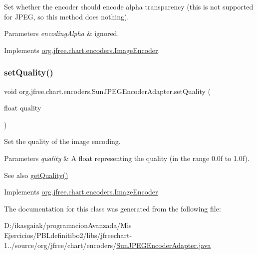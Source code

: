 Set whether the encoder should encode alpha transparency (this is not supported for J\+P\+EG, so this method does nothing).


\begin{DoxyParams}{Parameters}
{\em encoding\+Alpha} & ignored. \\
\hline
\end{DoxyParams}


Implements \mbox{\hyperlink{interfaceorg_1_1jfree_1_1chart_1_1encoders_1_1_image_encoder_a1f75e96b9ec512882b6d32c4f0bac3d2}{org.\+jfree.\+chart.\+encoders.\+Image\+Encoder}}.

\mbox{\label{classorg_1_1jfree_1_1chart_1_1encoders_1_1_sun_j_p_e_g_encoder_adapter_a00787c98635f7300875c0246d8403712}} 
\subsubsection{\texorpdfstring{set\+Quality()}{setQuality()}}
{\footnotesize\ttfamily void org.\+jfree.\+chart.\+encoders.\+Sun\+J\+P\+E\+G\+Encoder\+Adapter.\+set\+Quality (\begin{DoxyParamCaption}\item[{float}]{quality }\end{DoxyParamCaption})}

Set the quality of the image encoding.


\begin{DoxyParams}{Parameters}
{\em quality} & A float representing the quality (in the range 0.\+0f to 1.\+0f).\\
\hline
\end{DoxyParams}
\begin{DoxySeeAlso}{See also}
\mbox{\hyperlink{classorg_1_1jfree_1_1chart_1_1encoders_1_1_sun_j_p_e_g_encoder_adapter_af9230d0123dd8788669b558a94bb3c03}{get\+Quality()}} 
\end{DoxySeeAlso}


Implements \mbox{\hyperlink{interfaceorg_1_1jfree_1_1chart_1_1encoders_1_1_image_encoder_a143bbe40d39b16192a92128696877782}{org.\+jfree.\+chart.\+encoders.\+Image\+Encoder}}.



The documentation for this class was generated from the following file\+:\begin{DoxyCompactItemize}
\item 
D\+:/ikasgaiak/programacion\+Avanzada/\+Mis Ejercicios/\+P\+B\+Ldefinitibo2/libs/jfreechart-\/1../source/org/jfree/chart/encoders/\mbox{\hyperlink{_sun_j_p_e_g_encoder_adapter_8java}{Sun\+J\+P\+E\+G\+Encoder\+Adapter.\+java}}\end{DoxyCompactItemize}
